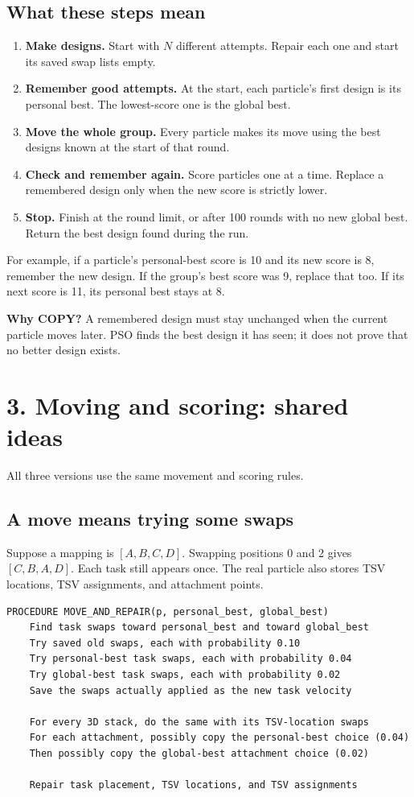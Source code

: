 \documentclass[11pt,a4paper]{article}
\begin{document}
\subsection*{What these steps mean}
\begin{enumerate}
\setlength{\itemsep}{1pt}
\setlength{\parskip}{0pt}
\item \textbf{Make designs.} Start with $N$ different attempts. Repair each one
and start its saved swap lists empty.
\item \textbf{Remember good attempts.} At the start, each particle's first
design is its personal best. The lowest-score one is the global best.
\item \textbf{Move the whole group.} Every particle makes its move using the
best designs known at the start of that round.
\item \textbf{Check and remember again.} Score particles one at a time.
Replace a remembered design only when the new score is strictly lower.
\item \textbf{Stop.} Finish at the round limit, or after 100 rounds with no
new global best. Return the best design found during the run.
\end{enumerate}

For example, if a particle's personal-best score is 10 and its new score is
8, remember the new design. If the group's best score was 9, replace that
too. If its next score is 11, its personal best stays at 8.

\textbf{Why COPY?} A remembered design must stay unchanged when the current
particle moves later. PSO finds the best design it has seen; it does not
prove that no better design exists.

\clearpage
\section*{3. Moving and scoring: shared ideas}
\label{page:shared}
All three versions use the same movement and scoring rules.

\subsection*{A move means trying some swaps}
Suppose a mapping is $[A,B,C,D]$. Swapping positions 0 and 2 gives
$[C,B,A,D]$. Each task still appears once. The real particle also stores
TSV locations, TSV assignments, and attachment points.

\begin{lstlisting}
PROCEDURE MOVE_AND_REPAIR(p, personal_best, global_best)
    Find task swaps toward personal_best and toward global_best
    Try saved old swaps, each with probability 0.10
    Try personal-best task swaps, each with probability 0.04
    Try global-best task swaps, each with probability 0.02
    Save the swaps actually applied as the new task velocity

    For every 3D stack, do the same with its TSV-location swaps
    For each attachment, possibly copy the personal-best choice (0.04)
    Then possibly copy the global-best attachment choice (0.02)

    Repair task placement, TSV locations, and TSV assignments
\end{lstlisting}
\end{document}

